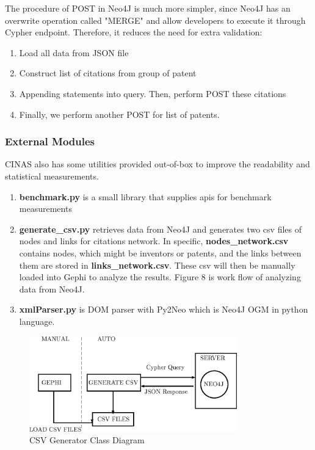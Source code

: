 \documentclass{sig-alternate}
\begin{document}
{The procedure of POST in Neo4J is much more simpler, since Neo4J has an overwrite operation called "MERGE" and allow developers to execute it through Cypher endpoint. Therefore, it reduces the need for extra validation:
\begin{enumerate}
 \item Load all data from JSON file
 \item Construct list of citations from group of patent
 \item Appending statements into query. Then, perform POST these citations 
 \item Finally, we perform another POST for list of patents.
\end{enumerate}

\subsubsection{External Modules}
CINAS also has some utilities provided out-of-box to improve the readability and statistical measurements. 
\begin{enumerate}
 \item \textbf{benchmark.py} is a small library that supplies apis for benchmark measurements
 \item \textbf{generate\_csv.py} retrieves data from Neo4J and generates two csv files of nodes and links for citations network. In specific, \textbf{nodes\_network.csv} contains nodes, which might be inventors or patents, and the links between them are stored in \textbf{links\_network.csv}. These csv will then be manually loaded into Gephi to analyze the results. Figure 8 is work flow of analyzing data from Neo4J. 
 \item \textbf{xmlParser.py} is DOM parser with Py2Neo which is Neo4J OGM in python language.
\end{enumerate}
\begin{figure}[htb]
\centering
\includegraphics[width=90mm]{generate.eps}
\caption{ CSV Generator Class Diagram}
\end{figure}
\begin{table}

\end{table}}
\end{document}
